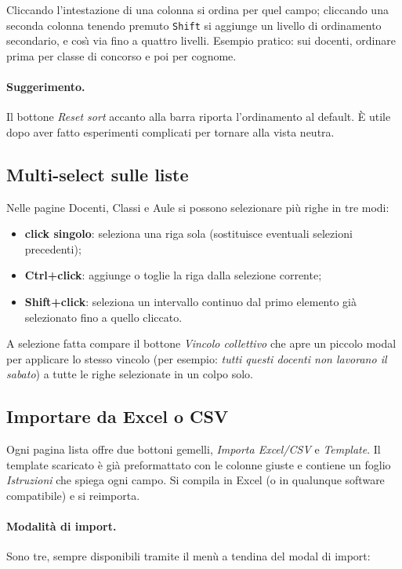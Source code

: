 Cliccando l'intestazione di una colonna si ordina per quel
campo; cliccando una seconda colonna tenendo premuto \texttt{Shift}
si aggiunge un livello di ordinamento secondario, e cos\`{\i} via
fino a quattro livelli. Esempio pratico: sui docenti, ordinare
prima per classe di concorso e poi per cognome.

\paragraph{Suggerimento.} Il bottone \emph{Reset sort} accanto
alla barra riporta l'ordinamento al default. \`E utile dopo aver
fatto esperimenti complicati per tornare alla vista neutra.

\subsection{Multi-select sulle liste}

Nelle pagine Docenti, Classi e Aule si possono selezionare pi\`u
righe in tre modi:

\begin{itemize}
\item \textbf{click singolo}: seleziona una riga sola
  (sostituisce eventuali selezioni precedenti);
\item \textbf{Ctrl+click}: aggiunge o toglie la riga dalla
  selezione corrente;
\item \textbf{Shift+click}: seleziona un intervallo continuo dal
  primo elemento gi\`a selezionato fino a quello cliccato.
\end{itemize}

A selezione fatta compare il bottone \emph{Vincolo collettivo}
che apre un piccolo modal per applicare lo stesso vincolo (per
esempio: \emph{tutti questi docenti non lavorano il sabato}) a
tutte le righe selezionate in un colpo solo.

\subsection{Importare da Excel o CSV}

Ogni pagina lista offre due bottoni gemelli, \emph{Importa
Excel/CSV} e \emph{Template}. Il template scaricato \`e gi\`a
preformattato con le colonne giuste e contiene un foglio
\emph{Istruzioni} che spiega ogni campo. Si compila in Excel
(o in qualunque software compatibile) e si reimporta.

\paragraph{Modalit\`a di import.} Sono tre, sempre disponibili
tramite il men\`u a tendina del modal di import:

